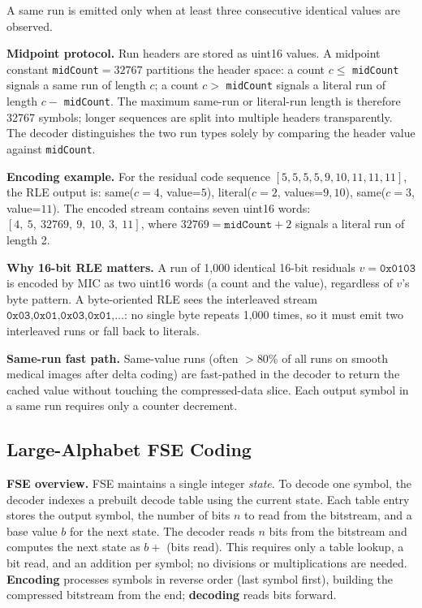 \documentclass[journal]{IEEEtran}
\begin{document}
A same run is emitted only when at least three consecutive identical values are
observed.

\textbf{Midpoint protocol.} Run headers are stored as uint16 values. A
midpoint constant \texttt{midCount}$= 32767$ partitions the header space: a
count $c \leq$ \texttt{midCount} signals a same run of length $c$; a count
$c >$ \texttt{midCount} signals a literal run of length $c -$
\texttt{midCount}.
The maximum same-run or literal-run length is therefore 32767 symbols; longer
sequences are split into multiple headers transparently. The decoder
distinguishes the two run types solely by comparing the header value against
\texttt{midCount}.

\textbf{Encoding example.} For the residual code sequence
$[5,5,5,5,9,10,11,11,11]$, the RLE output is:
same($c=4$, value=$5$), literal($c=2$, values=$9,10$), same($c=3$, value=$11$).
The encoded stream contains seven uint16 words:
$[4,\ 5,\ 32769,\ 9,\ 10,\ 3,\ 11]$, where $32769 = \texttt{midCount} + 2$
signals a literal run of length 2.

\textbf{Why 16-bit RLE matters.} A run of 1,000 identical 16-bit residuals
$v = \texttt{0x0103}$ is encoded by MIC as two uint16 words (a count and the
value), regardless of $v$'s byte pattern. A byte-oriented RLE sees the
interleaved stream $\texttt{0x03,0x01,0x03,0x01,\ldots}$: no single byte
repeats 1,000 times, so it must emit two interleaved runs or fall back to
literals.

\textbf{Same-run fast path.} Same-value runs (often $>$80\% of all runs on
smooth medical images after delta coding) are fast-pathed in the decoder to
return the cached value without touching the compressed-data slice. Each output
symbol in a same run requires only a counter decrement.

\subsection{Large-Alphabet FSE Coding}

\textbf{FSE overview.} FSE maintains a single integer \emph{state}. To decode
one symbol, the decoder indexes a prebuilt decode table using the current state.
Each table entry stores the output symbol, the number of bits $n$ to read from
the bitstream, and a base value $b$ for the next state. The decoder reads $n$
bits from the bitstream and computes the next state as $b +$ (bits read). This
requires only a table lookup, a bit read, and an addition per symbol; no
divisions or multiplications are needed. \textbf{Encoding} processes symbols in
reverse order (last symbol first), building the compressed bitstream from the
end; \textbf{decoding} reads bits forward.
\end{document}
